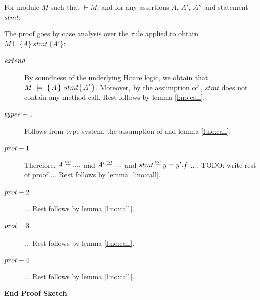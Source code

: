 \begin{theorem}
\label{l:triples:sound}
For module  $M$ %
such that  $\vdash M$, and for any assertions $A$,  $A'$, $A''$ and statement  $stmt$:
\end{theorem}
 

\noindent
\vspace{.2cm}
The proof goes by case analysis over the rule applied to obtain $M \vdash \{ A \}\ stmt \  \{ A' \} $:

\begin{description} 

\item[${\sc{extend}}$] 

By soundness of the underlying Hoare logic, we obtain that  $M\ \models\  \{\, A \, \}\ stmt \{\, A' \, \}$. Moreover, 
by the assumption of {}, $stmt$ does not contain any method call. Rest follows by lemma \ref{l:no:call}.

\item[${\sc{types-1}}$] 

Follows from type system, the assumption of {} and lemma \ref{l:no:call}.

\item[${\sc{prot-1}}$]  
Therefore, $A \txteq ....$ and $A' \txteq ....$  and $stmt \txteq y=y'.f$ .... TODO: write rest of proof ...
Rest follows by lemma \ref{l:no:call}.
\item[${\sc{prot-2}}$] ... Rest follows by lemma \ref{l:no:call}.

\item[${\sc{prot-3}}$] ... Rest follows by lemma \ref{l:no:call}.

\item[${\sc{prot-4}}$] ... Rest follows by lemma \ref{l:no:call}.

\end{description}
\noindent
\vspace{.1cm}
  {\textbf{End Proof Sketch}} 


